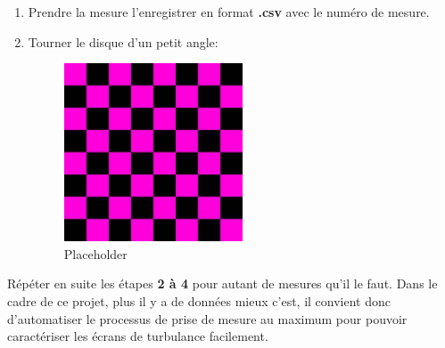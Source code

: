 \begin{enumerate}
    \item Prendre la mesure l'enregistrer en format \textbf{.csv} avec le numéro de mesure.
    \item Tourner le disque d'un petit angle:
          \begin{figure}[H]
              \centering
              \includegraphics[width=0.5\textwidth]{assets/figures/Placeholder.jpeg}
              \caption{Placeholder}\label{Placeholder}
          \end{figure}
\end{enumerate}

Répéter en suite les étapes \textbf{2 à 4} pour autant de mesures qu'il le faut.
Dans le cadre de ce projet, plus il y a de données mieux c'est, il convient donc d'automatiser le
processus de prise de mesure au maximum pour pouvoir caractériser les écrans de turbulance facilement.

